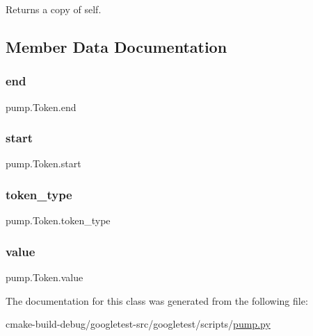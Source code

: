 \begin{DoxyVerb}Returns a copy of self.\end{DoxyVerb}
 

\subsection{Member Data Documentation}
\mbox{\label{classpump_1_1Token_abb88c0ece4274cfd974fd01d0468953c}} 
\subsubsection{\texorpdfstring{end}{end}}
{\footnotesize\ttfamily pump.\+Token.\+end}

\mbox{\label{classpump_1_1Token_a53e3333a770bc8773224a5af78bca5bb}} 
\subsubsection{\texorpdfstring{start}{start}}
{\footnotesize\ttfamily pump.\+Token.\+start}

\mbox{\label{classpump_1_1Token_aeac105b76f6af13c8c64ba0a94e37d90}} 
\subsubsection{\texorpdfstring{token\_type}{token\_type}}
{\footnotesize\ttfamily pump.\+Token.\+token\+\_\+type}

\mbox{\label{classpump_1_1Token_a5b7ab395a380b775b2bf0a8b0abfda86}} 
\subsubsection{\texorpdfstring{value}{value}}
{\footnotesize\ttfamily pump.\+Token.\+value}



The documentation for this class was generated from the following file\+:\begin{DoxyCompactItemize}
\item 
cmake-\/build-\/debug/googletest-\/src/googletest/scripts/\mbox{\hyperlink{pump_8py}{pump.\+py}}\end{DoxyCompactItemize}
